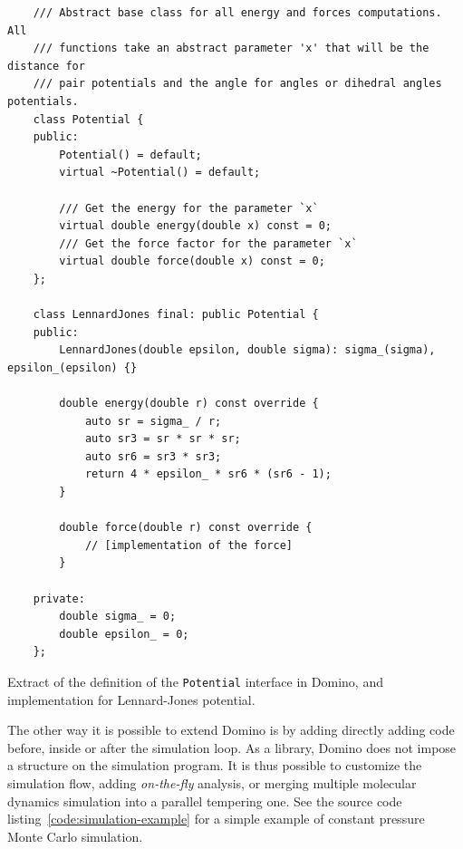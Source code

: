 \documentclass[thesis]{subfiles}
\begin{document}
\begin{listing}[ht]
    \begin{verbatim}
    /// Abstract base class for all energy and forces computations. All
    /// functions take an abstract parameter 'x' that will be the distance for
    /// pair potentials and the angle for angles or dihedral angles potentials.
    class Potential {
    public:
        Potential() = default;
        virtual ~Potential() = default;

        /// Get the energy for the parameter `x`
        virtual double energy(double x) const = 0;
        /// Get the force factor for the parameter `x`
        virtual double force(double x) const = 0;
    };

    class LennardJones final: public Potential {
    public:
        LennardJones(double epsilon, double sigma): sigma_(sigma), epsilon_(epsilon) {}

        double energy(double r) const override {
            auto sr = sigma_ / r;
            auto sr3 = sr * sr * sr;
            auto sr6 = sr3 * sr3;
            return 4 * epsilon_ * sr6 * (sr6 - 1);
        }

        double force(double r) const override {
            // [implementation of the force]
        }

    private:
        double sigma_ = 0;
        double epsilon_ = 0;
    };
    \end{verbatim}
    \caption{Extract of the definition of the \texttt{Potential} interface in
    Domino, and implementation for Lennard-Jones potential.}
    \label{code:potential}
\end{listing}

The other way it is possible to extend Domino is by adding directly adding code
before, inside or after the simulation loop. As a library, Domino does not
impose a structure on the simulation program. It is thus possible to customize
the simulation flow, adding \emph{on-the-fly} analysis, or merging multiple
molecular dynamics simulation into a parallel tempering one. See the source code
listing~\ref{code:simulation-example} for a simple example of constant pressure
Monte Carlo simulation.
\end{document}
